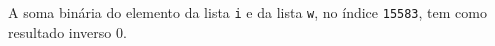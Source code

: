 \documentclass[12pt,varwidth=16cm,border=1pt]{standalone}
\begin{document}
A soma binária do elemento da lista \verb+i+ e da lista \verb+w+, no índice \verb+15583+, tem como resultado inverso 0.

\questiomtrue
\end{document}

